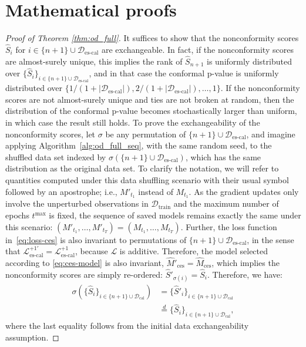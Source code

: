 \clearpage

\section{Mathematical proofs} \label{appendix:proofs}

\begin{proof}[Proof of Theorem \ref{thm:od_full}]
It suffices to show that the nonconformity scores $\hat{S}_i$ for $i \in \{n+1\}\cup \mathcal{D}_{\text{es-cal}}$ are exchangeable. In fact, if the nonconformity scores are almost-surely unique, this implies the rank of $\hat{S}_{n+1}$ is uniformly distributed over $\{\hat{S}_{i}\}_{i \in \{n+1\}\cup \mathcal{D}_{\text{es-cal}}}$, and in that case the conformal p-value is uniformly distributed over $\{ 1/(1+|\mathcal{D}_{\text{es-cal}}|), 2/(1+|\mathcal{D}_{\text{es-cal}}|), \dots, 1\}$. If the nonconformity scores are not almost-surely unique and ties are not broken at random, then the distribution of the conformal p-value becomes stochastically larger than uniform, in which case the result still holds.
To prove the exchangeability of the nonconformity scores, let $\sigma$ be any permutation of $\{n+1\}\cup \mathcal{D}_{\text{es-cal}}$, and imagine applying Algorithm~\ref{alg:od_full_seq}, with the same random seed, to the shuffled data set indexed by $\sigma(\{n+1\}\cup \mathcal{D}_{\text{es-cal}})$, which has the same distribution as the original data set. To clarify the notation, we will refer to quantities computed under this data shuffling scenario with their usual symbol followed by an apostrophe; i.e., $M'_{t_1}$ instead of $M_{t_1}$.
As the gradient updates only involve the unperturbed observations in $\mathcal{D}_{\text{train}}$ and the maximum number of epochs $t^{\text{max}}$ is fixed, the sequence of saved models remains exactly the same under this scenario: $(M'_{t_1} , \dots, M'_{t_T}) = (M_{t_1} , \dots, M_{t_T})$.
Further, the loss function in~\eqref{eq:loss-ces} is also invariant to permutations of $\{n+1\}\cup \mathcal{D}_{\text{es-cal}}$, in the sense that $\mathcal{L}_{\text{es-cal}}^{+1'} = \mathcal{L}_{\text{es-cal}}^{+1}$, because $\mathcal{L}$ is additive.
Therefore, the model selected according to \eqref{eq:ces-model} is also invariant, $\hat{M}'_{\text{ces}} = \hat{M}_{\text{ces}}$, which implies the nonconformity scores are simply re-ordered: $\hat{S}'_{\sigma(i)} = \hat{S}_{i}$.
Therefore, we have:
\begin{align*}
  \sigma(\{\hat{S}_i\}_{i \in \{n+1\}\cup \mathcal{D}_{\text{cal}}})
  &= \{\hat{S}'_i\}_{i \in \{n+1\}\cup \mathcal{D}_{\text{cal}}} \\
  & \overset{d}{=} \{\hat{S}_i\}_{i \in \{n+1\}\cup \mathcal{D}_{\text{cal}}},
\end{align*}
where the last equality follows from the initial data exchangeability assumption.
\end{proof}

